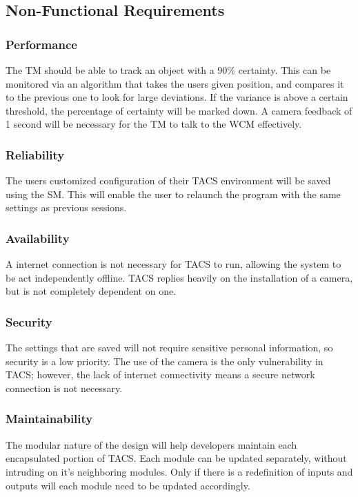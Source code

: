\documentclass[titlepage]{article}
\begin{document}
\subsection{Non-Functional Requirements}
\subsubsection{Performance}
The TM should be able to track an object with a 90\% certainty. This can be monitored via an algorithm that takes the users given position, and compares it to the previous one to look for large deviations. If the variance is above a certain threshold, the percentage of certainty will be marked down. A camera feedback of 1 second will be necessary for the TM to talk to the WCM effectively.

\subsubsection{Reliability}
The users customized configuration of their TACS environment will be saved using the SM. This will enable the user to relaunch the program with the same settings as previous sessions.

\subsubsection{Availability}
A internet connection is not necessary for TACS to run, allowing the system to be act independently offline. TACS replies heavily on the installation of a camera, but is not completely dependent on one.

\subsubsection{Security}
The settings that are saved will not require sensitive personal information, so security is a low priority. The use of the camera is the only vulnerability in TACS; however, the lack of internet connectivity means a secure network connection is not necessary. 

\subsubsection{Maintainability}
The modular nature of the design will help developers maintain each encapsulated portion of TACS. Each module can be updated separately, without intruding on it's neighboring modules. Only if there is a redefinition of inputs and outputs will each module need to be updated accordingly.
\end{document}
